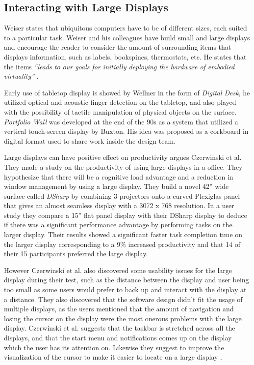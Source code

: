 \subsection{Interacting with Large Displays}
Weiser states that ubiquitous computers have to be of different sizes, each suited to a particular task. Weiser and his colleagues have build small and large displays and encourage the reader to consider the amount of surrounding items that displays information, such as labels, bookspines, thermostats, etc. He states that the items \emph{``leads to our goals for initially deploying the hardware of embodied virtuality''} \cite{Weiser:1991}.

Early use of tabletop display is showed by Wellner in the form of \emph{Digital Desk}, he utilized optical and acoustic finger detection on the tabletop, and also played with the possibility of tactile manipulation of physical objects on the surface.\cite{Wellner:1993} \emph{Portfolio Wall} was developed at the end of the 90s as a system that utilized a vertical touch-screen display by Buxton\cite{Buxton:2000}. His idea was proposed as a corkboard in digital format used to share work inside the design team.

Large displays can have positive effect on productivity argues Czerwinski et al. \cite{Czerwinski:2003} They made a study on the productivity of using large displays in a office. They hypothesize that there will be a cognitive load advantage and a reduction in window management by using a large display. They build a novel 42'' wide surface called \emph{DSharp} by combining 3 projectors onto a curved Plexiglas panel that gives an almost seamless display with a 3072 x 768 resolution. In a user study they compare a 15'' flat panel display with their DSharp display to deduce if there was a significant performance advantage by performing tasks on the larger display. Their results showed a significant faster task completion time on the larger display corresponding to a 9\% increased productivity and that 14 of their 15 participants preferred the large display.

However Czerwinski et al. \cite{Czerwinski:2003} also discovered some usability issues for the large display during their test, such as the distance between the display and user being too small as some users would prefer to back up and interact with the display at a distance. They also discovered that the software design didn't fit the usage of multiple displays, as the users mentioned that the amount of navigation and losing the cursor on the display were the most onerous problems with the large display.
Czerwinski et al. suggests that the taskbar is stretched across all the displays, and that the start menu and notifications comes up on the display which the user has its attention on. Likewise they suggest to improve the  visualization of the cursor to make it easier to locate on a large display \cite{Czerwinski:2003}.

